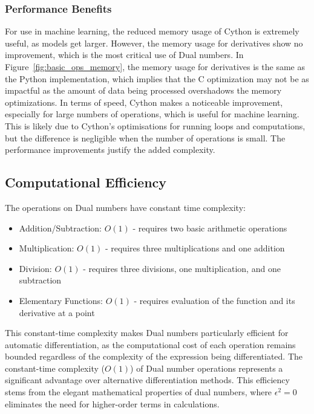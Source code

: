 \subsubsection{Performance Benefits}
For use in machine learning, the reduced memory usage of Cython is extremely useful, as models get larger.
However, the memory usage for derivatives show no improvement, which is the most critical use of Dual numbers.
In Figure~\ref{fig:basic_ops_memory}, the memory usage for derivatives is the same as the Python implementation,
which implies that the C optimization may not be as impactful as the amount of data being processed overshadows the memory optimizations. 
In terms of speed, Cython makes a noticeable improvement, especially for large numbers of operations, which is useful for machine learning.
This is likely due to Cython's optimisations for running loops and computations, 
but the difference is negligible when the number of operations is small. 
The performance improvements justify the added complexity. 

\subsection{Computational Efficiency}

The operations on Dual numbers have constant time complexity:

\begin{itemize}
    \item Addition/Subtraction: $O(1)$ - requires two basic arithmetic operations
    \item Multiplication: $O(1)$ - requires three multiplications and one addition
    \item Division: $O(1)$ - requires three divisions, one multiplication, and one subtraction
    \item Elementary Functions: $O(1)$ - requires evaluation of the function and its derivative at a point
\end{itemize}

This constant-time complexity makes Dual numbers particularly efficient for automatic differentiation, as the computational cost of each operation remains bounded regardless of the complexity of the expression being differentiated.
The constant-time complexity ($O(1)$) of Dual number operations represents a significant advantage over alternative differentiation methods. 
This efficiency stems from the elegant mathematical properties of dual numbers, where $\epsilon^2 = 0$ eliminates the need for higher-order terms in calculations. \\

